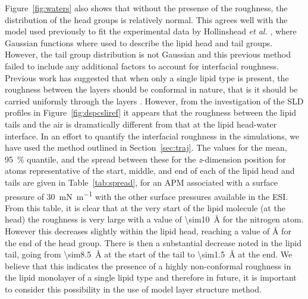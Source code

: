 Figure~\ref{fig:waters} also shows that without the presense of the roughness, the distribution of the head groups is relatively normal.
This agrees well with the model used previously to fit the experimental data by Hollinshead \emph{et al.} \cite{hollinshead_effects_2009}, where Gaussian functions where used to describe the lipid head and tail groups.
However, the tail group distribution is not Gaussian and this previous method failed to include any additional factors to account for interfacial roughness.
Previous work has suggested that when only a single lipid type is present, the roughness between the layers should be conformal in nature, that is it should be carried uniformly through the layers \cite{kozhevnikov_general_2012,campbell_structure_2018}.
However, from the investigation of the SLD profiles in Figure~\ref{fig:dspcsliref} it appears that the roughness between the lipid tails and the air is dramatically different from that at the lipid head-water interface.
In an effort to quantify the interfacial roughness in the simulations, we have used the method outlined in Section~\ref{sec:traj}.
The values for the mean, \SI{95}{\percent} quantile, and the spread between these for the \emph{z}-dimension position for atoms representative of the start, middle, and end of each of the lipid head and tails are given in Table~\ref{tab:spread}, for an APM associated with a surface pressure of \SI{30}{\milli\newton\per\meter} with the other surface pressures available in the ESI.
From this table, it is clear that at the very start of the lipid molecule (at the head) the roughness is very large with a value of \SI{\sim10}{\angstrom} for the nitrogen atom.
However this decreases slightly within the lipid head, reaching a value of \si{\angstrom} for the end of the head group.
There is then a substantial decrease noted in the lipid tail, going from \SI{\sim8.5}{\angstrom} at the start of the tail to \SI{\sim1.5}{\angstrom} at the end.
We believe that this indicates the presence of a highly non-conformal roughness in the lipid monolayer of a single lipid type and therefore in future, it is important to consider this possibility in the use of model layer structure method.
%
